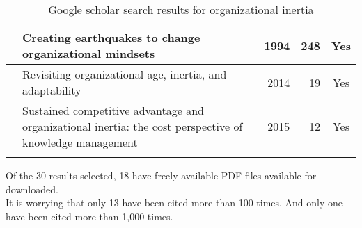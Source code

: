 \begin{longtable}{
    |>{\raggedright\arraybackslash}p{3.7cm}
    |>{\raggedright\arraybackslash}p{3.7cm}
    |r
    |r
    |c
    |}
    \cite{reger1994creating} & Creating earthquakes to change organizational mindsets &  1994 & 248 & Yes \\
	\hline 
    \cite{chen2014revisiting} & Revisiting organizational age, inertia, and adaptability & 2014 & 19 & Yes \\
	\hline 
    \cite{hung2015sustained} & Sustained competitive advantage and organizational inertia: the cost perspective of knowledge management & 2015 & 12 & Yes \\
	\hline 
	\caption{Google scholar search results for organizational inertia} 
\end{longtable} 



Of the 30 results selected, 18 have freely available PDF files available for downloaded.\\

It is worrying that only 13 have been cited more than 100 times. And only one have been cited more than 1,000 times.\\
